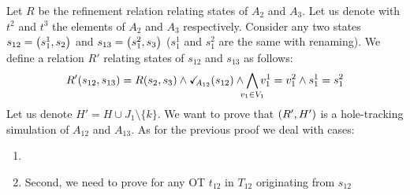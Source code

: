 \documentclass[runningheads]{llncs}
\begin{document}
Let $R$ be the refinement relation relating states of $A_2$ and $A_3$. 
Let us denote with $t^2$ and $t^3$  the elements of $A_2$ and $A_3$ respectively.
Consider any two states $s_{12} = {\left(s^1_1,s_2\right)}$ and $s_{13} = {\left(s^2_1,s_3\right)}$ ($s^1_1$ and $s^2_1$  are the same with renaming). We define a relation $R'$ relating states of $s_{12}$ and $s_{13}$ as follows:
\[ R' \mpar{s_{12}, s_{13}} = R\mpar{s_{2}, s_{3}} \land \reach{A_{12}}(s_{12}) \wedge \bigwedge_\subbox{v_1\in V_1}
 v^1_1=v^2_1\wedge s^1_1 = s^2_1\]
Let us denote $H'=H\cup J_1 \setminus\{k\}$.
We want to prove that ${\left(R', H'\right)}$  is a hole-tracking simulation of $A_{12}$ and $A_{13}$. As for the previous proof we deal with cases:
\begin{enumerate}
\item {}

\item Second, we need to prove for any OT $t_{12}$ in $T_{12}$ originating from $s_{12}$


\end{enumerate}
\end{document}

